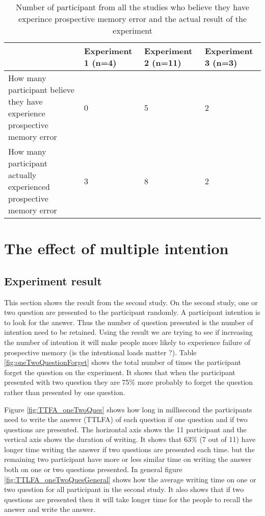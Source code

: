 \begin{table}[]
\centering
\small
\footnotesize
\begin{tabu}{|X[6,l]|X[2,c]|X[2,c]|X[2,c]|}
\hline
                                                                           & Experiment 1 (n=4) & Experiment 2 (n=11) & Experiment 3 (n=3) \\ \hline
How many participant believe they have experience prospective memory error & 0                  & 5                   & 2                  \\ \hline
How many participant actually experienced prospective memory error          & 3                  & 8                   & 2                  \\ \hline
\end{tabu}
\caption{Number of participant from all the studies who believe they have experince prospective memory error and the actual result of the experiment}
\label{fig:affirmationTable}
\end{table}



\section{The effect of multiple intention}

\subsection{Experiment result}
This section shows the result from the second study. On the second study, one or two question are presented to the participant randomly.
A participant intention is to look for the answer. Thus the number of question presented is the number of intention need to be retained.
Using the result we are trying to see  if increasing the number of intention it will make people more likely to experience failure of prospective memory (is the intentional loads matter ?).
Table \ref{fig:oneTwoQuestionForget} shows the total number of times the participant forget the question on the experiment.
It shows that when the participant presented with two question they are 75\% more probably to forget the
question rather than presented by one question.

Figure \ref{fig:TTFA_oneTwoQues} shows how long in millisecond the participants need to write the answer (TTLFA) of each question if one question and if two questions are presented.
The horizontal axis shows the 11 participant and the vertical axis shows the duration of writing. It shows that 63\% (7 out of 11) have longer time
writing the answer if two questions are presented each time. but the remaining two participant have more or less similar time on writing the answer both on
one or two questions presented.
In general figure \ref{fig:TTLFA_oneTwoQuesGeneral} shows how the average writing time on one or two question for all participant in the second study.
It also shows that if two questions are presented then it will take longer time for the people to recall the answer and write the answer.

